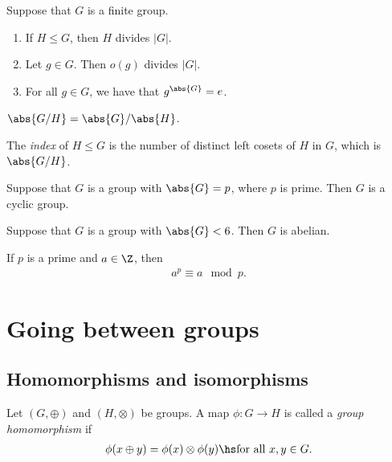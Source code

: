 \documentclass{article}
\begin{document}
\begin{theorem}
    Suppose that $G$ is a finite group.
    \begin{enumerate}
        \item If $H\leq G$, then $H$ divides $|G|$.
        \item Let $g\in G$. Then $o(g)$ divides $|G|$.
        \item For all $g\in G$, we have that $g^{\abs{G}}=e$.
    \end{enumerate}
\end{theorem}

\begin{corollary}
    $\abs{G / H}= \abs{G}/\abs{H}$.
\end{corollary}

\begin{definition}
    The \emph{index} of $H\leq G$ is the number of distinct
    left cosets of $H$ in $G$, which is $\abs{G/H}$.
\end{definition}

\begin{theorem}
    Suppose that $G$ is a group with $\abs{G}=p$, where $p$ is
    prime. Then $G$ is a cyclic group.
\end{theorem}

\begin{corollary}
    Suppose that $G$ is a group with $\abs{G}<6$. Then $G$ is abelian.
\end{corollary}

\begin{theorem}
    If $p$ is a prime and $a\in\Z$, then
    \begin{align*}
        a^{p}\equiv a \mod p.
    \end{align*}
\end{theorem}


\section{Going between groups}


\subsection{Homomorphisms and isomorphisms}

\begin{definition}
    Let $(G, \oplus)$ and $(H, \otimes)$ be groups. A map $\phi:G\to H$
    is called a \emph{group homomorphism} if
    \begin{align*}
        \phi(x \oplus y) = \phi(x)\otimes \phi(y)\hs\text{for all }x,y\in G.
    \end{align*}
\end{definition}
\end{document}
